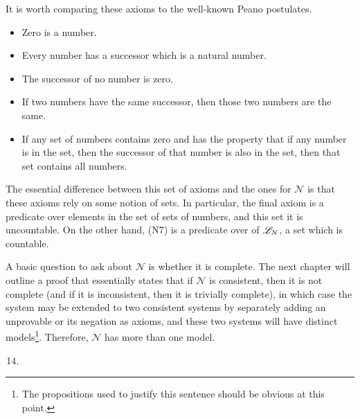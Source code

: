 It is worth comparing these axioms to the well-known Peano postulates.
\begin{itemize}
  \item Zero is a number.
  \item Every number has a successor which is a natural number.
  \item The successor of no number is zero.
  \item If two numbers have the same successor, then those two numbers are the same.
  \item If any set of numbers contains zero and has the property that if any number is in the set, then the successor of that number is also in the set, then that set contains all numbers.
\end{itemize}

The essential difference between this set of axioms and the ones for \(\mathcal{N}\) is that these axioms rely on some notion of sets. In particular, the final axiom is a predicate over elements in the set of sets of numbers, and this set it is uncountable. On the other hand, (N7) is a predicate over \wfs{} of \(\mathscr{L}_{N}\), a set which is countable.

A basic question to ask about \(\mathcal{N}\) is whether it is complete. The next chapter will outline a proof that essentially states that if \(\mathcal{N}\) is consistent, then it is not complete (and if it is inconsistent, then it is trivially complete), in which case the system may be extended to two consistent systems by separately adding an unprovable \wf{} or its negation as axioms, and these two systems will have distinct models\footnote{The propositions used to justify this sentence should be obvious at this point.}. Therefore, \(\mathcal{N}\) has more than one model.

\solutions{}
\begin{enumerate}
  \setcounter{enumi}{13}
  \item %
\end{enumerate}
